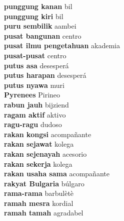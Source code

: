 \textbf{ punggung kanan  } bil \\
\textbf{ punggung kiri  } bil \\
\textbf{ puru sembilik  } aambei \\
\textbf{ pusat bangunan  } centro \\
\textbf{ pusat ilmu pengetahuan  } akademia \\
\textbf{ pusat-pusat  } centro \\
\textbf{ putus asa  } desesperá \\
\textbf{ putus harapan  } desesperá \\
\textbf{ putus nyawa  } muri \\
\textbf{ Pyrenees  } Pirineo \\
\textbf{ rabun jauh  } bijziend \\
\textbf{ ragam aktif  } aktivo \\
\textbf{ ragu-ragu  } dudoso \\
\textbf{ rakan kongsi  } acompañante \\
\textbf{ rakan sejawat  } kolega \\
\textbf{ rakan sejenayah  } acesorio \\
\textbf{ rakan sekerja  } kolega \\
\textbf{ rakan usaha sama  } acompañante \\
\textbf{ rakyat Bulgaria  } búlgaro \\
\textbf{ rama-rama  } barbulètè \\
\textbf{ ramah mesra  } kordial \\
\textbf{ ramah tamah  } agradabel \\

